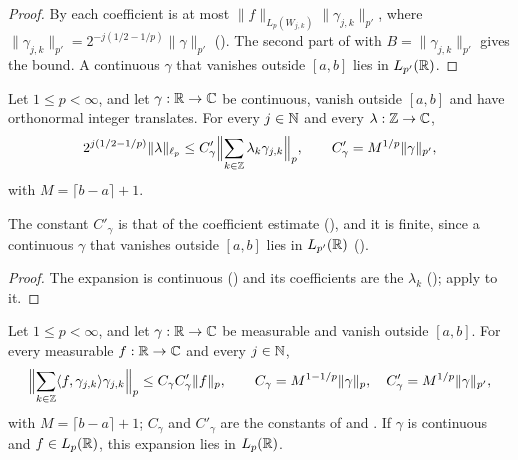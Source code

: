 \begin{proof}
\leanok
{}
By  each coefficient is at most
$\|f\|_{L_p(W_{j,k})} \|\gamma_{j,k}\|_{p'}$, where
$\|\gamma_{j,k}\|_{p'} = 2^{-j(1/2 - 1/p)} \|\gamma\|_{p'}$ ().
The second part of  with $B = \|\gamma_{j,k}\|_{p'}$ gives the
bound. A continuous $\gamma$ that vanishes outside $[a, b]$ lies in $L_{p'}(\mathbb{R})$.
\end{proof}

\begin{theorem}
\label{thm:daub-lower-stability}
\leanok
{}
Let $1 \leq p < \infty$, and let $\gamma : \mathbb{R} \to \mathbb{C}$ be continuous, vanish outside $[a, b]$ and
have orthonormal integer translates. For every $j \in \mathbb{N}$ and every $\lambda : \mathbb{Z} \to \mathbb{C}$,
\[
  2^{j(1/2 - 1/p)} \|\lambda\|_{\ell_p}
  \leq C'_\gamma \Bigl\|\sum_{k \in \mathbb{Z}} \lambda_k \gamma_{j,k}\Bigr\|_p , \qquad
  C'_\gamma = M^{1/p} \|\gamma\|_{p'} ,
\]
with $M = \lceil b - a \rceil + 1$.
\end{theorem}

The constant $C'_\gamma$ is that of the coefficient estimate (),
and it is finite, since a continuous $\gamma$ that vanishes outside $[a, b]$ lies in $L_{p'}(\mathbb{R})$
().

\begin{proof}
\leanok
{}
The expansion is continuous () and its coefficients are the
$\lambda_k$ (); apply  to it.
\end{proof}

\begin{lemma}
\label{lem:daub-expand-coeff}
\leanok
{}
Let $1 \leq p < \infty$, and let $\gamma : \mathbb{R} \to \mathbb{C}$ be measurable and vanish outside
$[a, b]$. For every measurable $f : \mathbb{R} \to \mathbb{C}$ and every $j \in \mathbb{N}$,
\[
  \Bigl\|\sum_{k \in \mathbb{Z}} \langle f, \gamma_{j,k} \rangle \gamma_{j,k}\Bigr\|_p
  \leq C_\gamma C'_\gamma \|f\|_p , \qquad
  C_\gamma = M^{1 - 1/p} \|\gamma\|_p , \quad C'_\gamma = M^{1/p} \|\gamma\|_{p'} ,
\]
with $M = \lceil b - a \rceil + 1$; $C_\gamma$ and $C'_\gamma$ are the constants of
 and . If $\gamma$ is continuous
and $f \in L_p(\mathbb{R})$, this expansion lies in $L_p(\mathbb{R})$.
\end{lemma}


